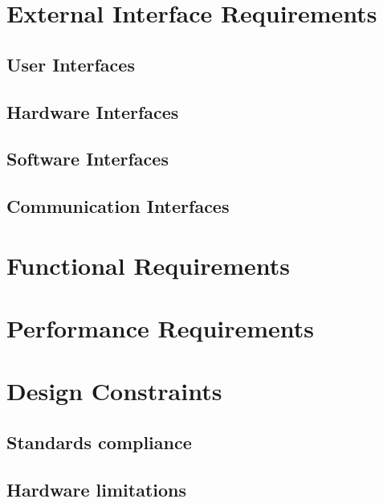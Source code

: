 \section{External Interface Requirements}\label{sec:external_interface_requirements}

\subsection{User Interfaces}\label{subsec:user_interfaces}

\subsection{Hardware Interfaces}\label{subsec:hardware_interfaces}

\subsection{Software Interfaces}\label{subsec:software_interfaces}

\subsection{Communication Interfaces}\label{subsec:communication_interfaces}


\section{Functional Requirements}\label{sec:functional_requirements}


\section{Performance Requirements}\label{sec:performance_requirements}


\section{Design Constraints}\label{sec:design_constraints}

\subsection{Standards compliance}\label{subsec:standards_compliance}

\subsection{Hardware limitations}\label{subsec:hardware_limitations}


